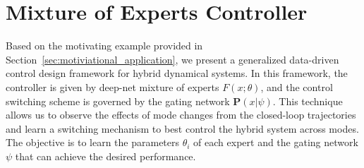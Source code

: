 \section{Mixture of Experts Controller}
\label{sec:moe_methods}

Based on the motivating example provided in
Section~\ref{sec:motiviational_application}, we present a generalized
data-driven control design framework for hybrid dynamical systems.
%
In this framework, the controller is given by deep-net mixture of experts
$F(x;\theta)$, and the control switching scheme is governed by the gating
network $\mathbf{P}(x|\psi)$.
%
This technique allows us to observe the effects of mode changes from the
closed-loop trajectories and learn a switching mechanism to best control the
hybrid system across modes.
%
The objective is to learn the parameters $\theta_i$ of each expert and the
gating network $\psi$ that can achieve the desired performance.


